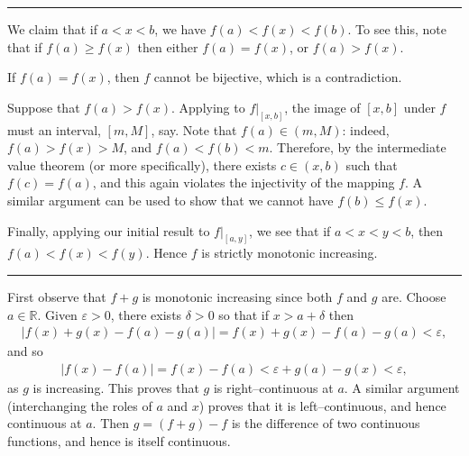 \documentclass[letterpaper,10pt,english]{jupyterBook}
\begin{document}
\bigskip\hrule\bigskip


\sphinxAtStartPar
{\hyperref[\detokenize{Problems:id34}]{}} We claim that if \(a < x < b\), we have \(f(a) < f(x) < f(b)\). To see this, note that if \(f(a) \geq f(x)\) then either \(f(a) = f(x)\), or \(f(a) > f(x)\).

If \(f(a)=f(x)\), then \(f\) cannot be bijective, which is a contradiction.

Suppose that \(f(a)>f(x)\). Applying  to \(f|_{[x,b]}\), the image of \([x,b]\) under \(f\) must an interval, \([m,M]\), say. Note that \(f(a)\in(m,M)\): indeed, \(f(a)>f(x)>M\), and \(f(a)<f(b)<m\). Therefore, by the intermediate value theorem (or  more specifically), there exists \(c \in (x, b)\) such that \(f(c) = f(a)\), and this again violates the injectivity of the mapping \(f\). A similar argument can be used to show that we cannot have \(f(b) \leq f(x)\).

Finally, applying our initial result to \(f|_{[a, y]}\), we see that if \(a<x<y<b\), then \(f(a) < f(x) < f(y)\). Hence \(f\) is strictly monotonic increasing.


\bigskip\hrule\bigskip


\sphinxAtStartPar
{\hyperref[\detokenize{Problems:id35}]{}} First observe that \(f+g\) is monotonic increasing since both \(f\) and \(g\) are. Choose \(a \in \mathbb{R}\). Given \(\varepsilon > 0\), there exists \(\delta > 0\) so that if \(x > a + \delta\) then
\begin{equation*}
\begin{split}
|f(x) + g(x) - f(a) - g(a)|  =  f(x) + g(x) - f(a) - g(a) < \varepsilon,
\end{split}
\end{equation*}
\sphinxAtStartPar
and so
\begin{equation*}
\begin{split}
|f(x) - f(a)| = f(x) - f(a) < \varepsilon +g(a) - g(x) < \varepsilon,
\end{split}
\end{equation*}
\sphinxAtStartPar
as \(g\) is increasing. This proves that \(g\) is right–continuous at \(a\). A similar argument (interchanging the roles of \(a\) and \(x\)) proves that it is left–continuous, and hence continuous at \(a\). Then \(g = (f + g) - f\) is the difference of two continuous functions, and hence is itself continuous.
\end{document}
